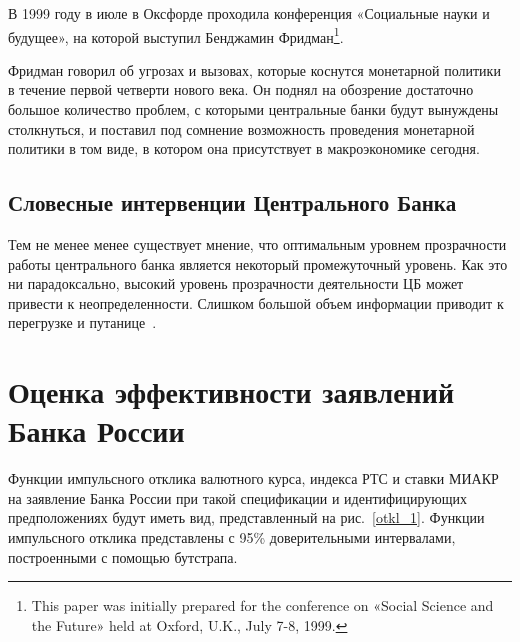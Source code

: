 \documentclass[14pt,a4paper, oneside]{extreport}
\theoremstyle{plain}              %
\theoremstyle{definition}         %
\begin{document}
В 1999 году в июле в Оксфорде проходила конференция «Социальные науки и будущее», на которой выступил Бенджамин Фридман\footnote{This paper was initially prepared for the conference on «Social Science and the Future» held at Oxford, U.K., July 7-8, 1999.}. 

Фридман говорил об угрозах и вызовах, которые коснутся монетарной политики в течение первой четверти нового века. Он поднял на обозрение достаточно большое количество проблем, с которыми  центральные банки будут вынуждены столкнуться, и поставил под сомнение возможность проведения монетарной политики в том виде, в котором она присутствует в макроэкономике сегодня. 

\section{Словесные интервенции Центрального Банка}

Тем не менее менее существует мнение, что оптимальным уровнем прозрачности работы центрального банка является некоторый промежуточный уровень. Как это ни парадоксально, высокий уровень прозрачности деятельности ЦБ может привести к неопределенности.  Слишком большой объем информации приводит к перегрузке и путанице~\cite{morris2005central}.


\chapter{Оценка эффективности заявлений Банка России}

Функции импульсного отклика валютного курса, индекса РТС и ставки МИАКР на заявление Банка России при такой спецификации и идентифицирующих предположениях будут иметь вид, представленный на рис.~\ref{otkl_1}. Функции импульсного отклика представлены с 95\% доверительными интервалами, построенными с помощью бутстрапа.
\end{document}
